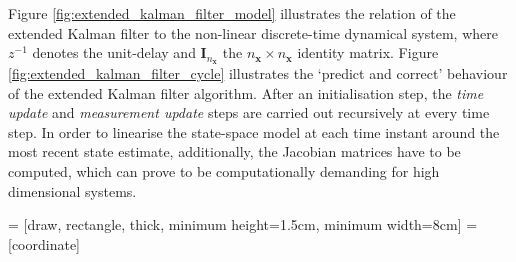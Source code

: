 Figure \ref{fig:extended_kalman_filter_model} illustrates the relation of the extended Kalman filter to the non-linear discrete-time dynamical system, where $z^{-1}$ denotes the unit-delay and $\bm{I}_{n_{\bm{x}}}$ the $n_{\bm{x}}\times n_{\bm{x}}$ identity matrix. Figure \ref{fig:extended_kalman_filter_cycle} illustrates the `predict and correct' behaviour of the extended Kalman filter algorithm. After an initialisation step, the \emph{time update} and \emph{measurement update} steps are carried out recursively at every time step. In order to linearise the state-space model at each time instant around the most recent state estimate, additionally, the Jacobian matrices have to be computed, which can prove to be computationally demanding for high dimensional systems.


 = [draw, rectangle, thick, 
    minimum height=1.5cm, minimum width=8cm]
 = [coordinate]

